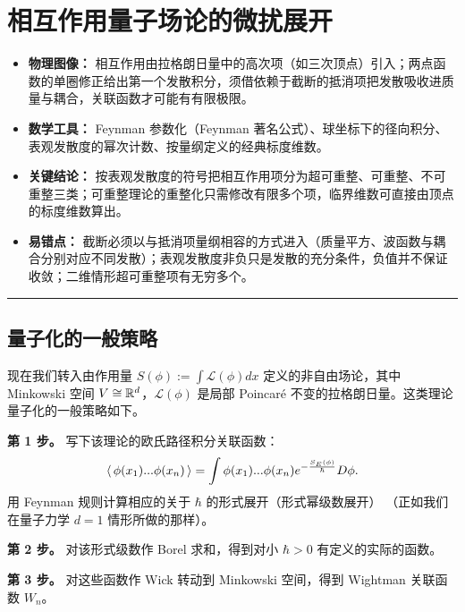 \section{相互作用量子场论的微扰展开}

\begin{keytakeaways}
\begin{itemize}
  \item \textbf{物理图像：} 相互作用由拉格朗日量中的高次项（如三次顶点）引入；两点函数的单圈修正给出第一个发散积分，须借依赖于截断的抵消项把发散吸收进质量与耦合，关联函数才可能有有限极限。
  \item \textbf{数学工具：} Feynman 参数化（Feynman 著名公式）、球坐标下的径向积分、表观发散度的幂次计数、按量纲定义的经典标度维数。
  \item \textbf{关键结论：} 按表观发散度的符号把相互作用项分为超可重整、可重整、不可重整三类；可重整理论的重整化只需修改有限多个项，临界维数可直接由顶点的标度维数算出。
  \item \textbf{易错点：} 截断必须以与抵消项量纲相容的方式进入（质量平方、波函数与耦合分别对应不同发散）；表观发散度非负只是发散的充分条件，负值并不保证收敛；二维情形超可重整项有无穷多个。
\end{itemize}
\end{keytakeaways}

\bigskip
\noindent\rule{\textwidth}{0.6pt}
\bigskip

\subsection{量子化的一般策略}
现在我们转入由作用量
$S(\phi):=\int \mathcal L(\phi)dx$ 定义的非自由场论，其中 Minkowski 空间 $V\cong \Bbb R^d$，$\mathcal L(\phi)$ 是局部 Poincaré 不变的拉格朗日量。这类理论量子化的一般策略如下。

{\bf 第 1 步。} 写下该理论的欧氏路径积分关联函数：
$$
\la \phi(x_1)...\phi(x_n)\ra=\int \phi(x_1)...\phi(x_n)e^{-\frac{S_E(\phi)}{\hbar}}D\phi.
$$
用 Feynman 规则计算相应的关于 $\hbar$ 的形式展开（形式幂级数展开）
（正如我们在量子力学 $d=1$ 情形所做的那样）。

{\bf 第 2 步。} 对该形式级数作 Borel 求和，得到对小 $\hbar>0$ 有定义的实际的函数。

{\bf 第 3 步。} 对这些函数作 Wick 转动到 Minkowski 空间，得到 Wightman 关联函数 $W_n$。

